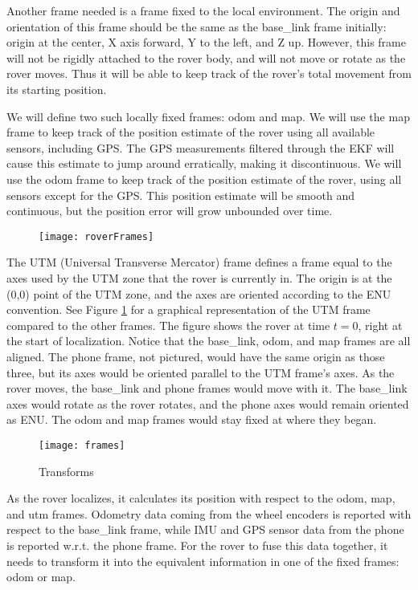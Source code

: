 Another frame needed is a frame fixed to the local environment. The origin and orientation of this frame should be the same as the base\_link frame initially: origin at the center, X axis forward, Y to the left, and Z up. However, this frame will not be rigidly attached to the rover body, and will not move or rotate as the rover moves. Thus it will be able to keep track of the rover's total movement from its starting position.

We will define two such locally fixed frames: odom and map. We will use the map frame to keep track of the position estimate of the rover using all available sensors, including GPS. The GPS measurements filtered through the EKF will cause this estimate to jump around erratically, making it discontinuous. We will use the odom frame to keep track of the position estimate of the rover, using all sensors except for the GPS. This position estimate will be smooth and continuous, but the position error will grow unbounded over time.

\begin{figure}[h]
	\caption{\cite{robot_localization_wiki}}
	\label{fig:roverFrames}
	\centering
	\texttt{[image: roverFrames]}
\end{figure}

The UTM (Universal Transverse Mercator) frame defines a frame equal to the axes used by the UTM zone that the rover is currently in. The origin is at the (0,0) point of the UTM zone, and the axes are oriented according to the ENU convention. See Figure \ref{fig:roverFrames} for a graphical representation of the UTM frame compared to the other frames. The figure shows the rover at time \(t = 0\), right at the start of localization. Notice that the base\_link, odom, and map frames are all aligned. The phone frame, not pictured, would have the same origin as those three, but its axes would be oriented parallel to the UTM frame's axes. As the rover moves, the base\_link and phone frames would move with it. The base\_link axes would rotate as the rover rotates, and the phone axes would remain oriented as ENU. The odom and map frames would stay fixed at where they began. 

\begin{wrapfigure}{R}{0.5\textwidth}
	\caption{Transforms}
	\centering
	\texttt{[image: frames]}
	\label{fig:frames}
\end{wrapfigure}

As the rover localizes, it calculates its position with respect to the odom, map, and utm frames. Odometry data coming from the wheel encoders is reported with respect to the base\_link frame, while IMU and GPS sensor data from the phone is reported w.r.t. the phone frame. For the rover to fuse this data together, it needs to transform it into the equivalent information in one of the fixed frames: odom or map. 


